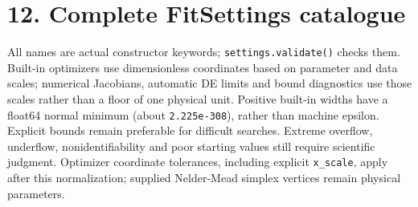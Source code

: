 \documentclass[
  10pt,
  a4paper,
  oneside]{scrreprt}
\begin{document}
\hypertarget{complete-fitsettings-catalogue}{%
\section{12. Complete FitSettings
catalogue}\label{complete-fitsettings-catalogue}}

All names are actual constructor keywords; \texttt{settings.validate()}
checks them. Built-in optimizers use dimensionless coordinates based on
parameter and data scales; numerical Jacobians, automatic DE limits and
bound diagnostics use those scales rather than a floor of one physical
unit. Positive built-in widths have a float64 normal minimum (about
\texttt{2.225e-308}), rather than machine epsilon. Explicit bounds
remain preferable for difficult searches. Extreme overflow, underflow,
nonidentifiability and poor starting values still require scientific
judgment. Optimizer coordinate tolerances, including explicit
\texttt{x\_scale}, apply after this normalization; supplied Nelder-Mead
simplex vertices remain physical parameters.
\end{document}
